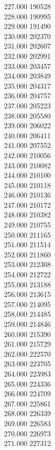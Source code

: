 { 227.000	190528 \\
 228.000	190995 \\
 229.000	191490 \\
 230.000	202370 \\
 231.000	202607 \\
 232.000	202991 \\
 233.000	203457 \\
 234.000	203849 \\
 235.000	204317 \\
 236.000	204757 \\
 237.000	205223 \\
 238.000	205580 \\
 239.000	206022 \\
 240.000	206411 \\
 241.000	207552 \\
 242.000	210056 \\
 243.000	210082 \\
 244.000	210100 \\
 245.000	210118 \\
 246.000	210136 \\
 247.000	210172 \\
 248.000	210382 \\
 249.000	210755 \\
 250.000	211165 \\
 251.000	211514 \\
 252.000	211860 \\
 253.000	212308 \\
 254.000	212722 \\
 255.000	213188 \\
 256.000	213615 \\
 257.000	214095 \\
 258.000	214485 \\
 259.000	214846 \\
 260.000	215390 \\
 261.000	215729 \\
 262.000	222570 \\
 263.000	223705 \\
 264.000	223983 \\
 265.000	224336 \\
 266.000	224709 \\
 267.000	225861 \\
 268.000	226339 \\
 269.000	226583 \\
 270.000	226973 \\
 271.000	227312 \\
}
